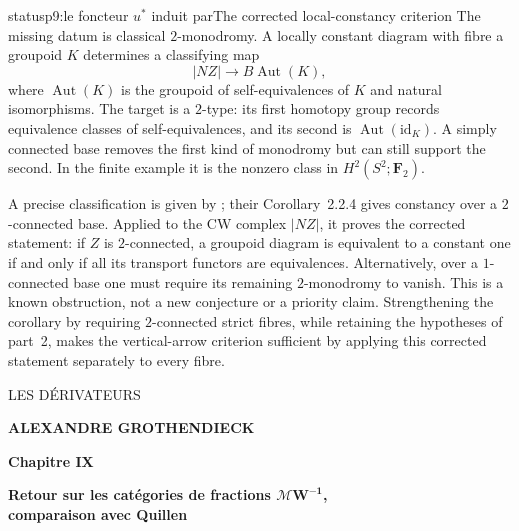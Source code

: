 \begin{dcomment}{status}{p9:le foncteur $u^*$ induit par}{The corrected local-constancy criterion}
The missing datum is classical $2$-monodromy. A locally constant diagram with fibre a groupoid $K$ determines a classifying map
\[
 |NZ|\longrightarrow B\operatorname{Aut}(K),
\]
where $\operatorname{Aut}(K)$ is the groupoid of self-equivalences of $K$ and natural isomorphisms. The target is a $2$-type: its first homotopy group records equivalence classes of self-equivalences, and its second is $\operatorname{Aut}(\mathrm{id}_K)$. A simply connected base removes the first kind of monodromy but can still support the second. In the finite example it is the nonzero class in $H^2(S^2;\mathbf F_2)$.

A precise classification is given by \citet[arXiv version, Theorem~2.2.5 and \S2.3]{PoleselloWaschkies2005}; their Corollary~2.2.4 gives constancy over a $2$-connected base. Applied to the CW complex $|NZ|$, it proves the corrected statement: if $Z$ is $2$-connected, a groupoid diagram is equivalent to a constant one if and only if all its transport functors are equivalences. Alternatively, over a $1$-connected base one must require its remaining $2$-monodromy to vanish. This is a known obstruction, not a new conjecture or a priority claim. Strengthening the corollary by requiring $2$-connected strict fibres, while retaining the hypotheses of part~2, makes the vertical-arrow criterion sufficient by applying this corrected statement separately to every fibre.
\end{dcomment}

\begin{center}
{\LARGE\textsf{LES DÉRIVATEURS}}

\bigskip

\textbf{ALEXANDRE GROTHENDIECK}

\bigskip\bigskip

\textbf{Chapitre IX}

\textbf{Retour sur les catégories de fractions $\boldsymbol{\mathcal{M}W^{-1}}$,\\
comparaison avec Quillen}
\end{center}

